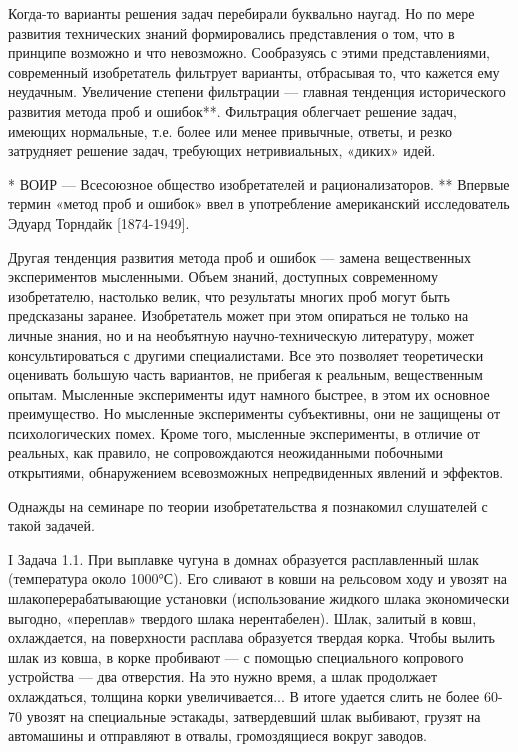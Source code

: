 Когда-то  варианты  решения  задач  перебирали  буквально  наугад.  Но
по  мере развития  технических  знаний  формировались представления  о
том,  что  в  принципе  возможно   и  что  невозможно.  Сообразуясь  с
этими  представлениями, современный  изобретатель фильтрует  варианты,
отбрасывая  то,   что  кажется   ему  неудачным.   Увеличение  степени
фильтрации —  главная тенденция  исторического развития метода  проб и
ошибок**. Фильтрация облегчает решение задач, имеющих нормальные, т.е.
более или менее  привычные, ответы, и резко  затрудняет решение задач,
требующих нетривиальных, «диких» идей.

*  ВОИР  —  Всесоюзное   общество  изобретателей  и
рационализаторов.   **   Впервые   термин  «метод   проб   и   ошибок»
ввел  в   употребление  американский  исследователь   Эдуард  Торндайк
[1874-1949].


Другая тенденция развития  метода проб и ошибок  — замена вещественных
экспериментов   мысленными.  Объем   знаний,  доступных   современному
изобретателю,  настолько  велик,  что  результаты  многих  проб  могут
быть  предсказаны заранее.  Изобретатель может  при этом  опираться не
только  на  личные  знания,  но  и  на  необъятную  научно-техническую
литературу, может  консультироваться с другими специалистами.  Все это
позволяет теоретически оценивать большую  часть вариантов, не прибегая
к реальным,  вещественным опытам. Мысленные эксперименты  идут намного
быстрее, в  этом их  основное преимущество. Но  мысленные эксперименты
субъективны,  они   не  защищены   от  психологических   помех.  Кроме
того,  мысленные эксперименты,  в  отличие от  реальных, как  правило,
не  сопровождаются  неожиданными  побочными  открытиями,  обнаружением
всевозможных непредвиденных явлений и эффектов.


Однажды на семинаре по теории изобретательства я познакомил слушателей
с такой задачей.

I Задача  1.1. При выплавке  чугуна в домнах  образуется расплавленный
шлак (температура около 1000°С). Его сливают в ковши на рельсовом ходу
и  увозят на  шлакоперерабатывающие  установки (использование  жидкого
шлака экономически  выгодно, «переплав» твердого  шлака нерентабелен).
Шлак, залитый в ковш,  охлаждается, на поверхности расплава образуется
твердая  корка.  Чтобы вылить  шлак  из  ковша,  в корке  пробивают  —
с  помощью  специального  копрового  устройства —  два  отверстия.  На
это  нужно  время,  а   шлак  продолжает  охлаждаться,  толщина  корки
увеличивается... В  итоге удается слить  не более 60-70%
увозят на специальные эстакады,  затвердевший шлак выбивают, грузят на
автомашины и отправляют в отвалы, громоздящиеся вокруг заводов.


